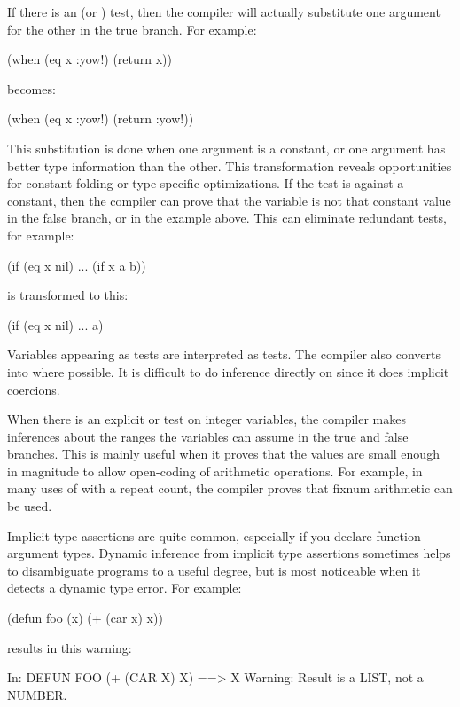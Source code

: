 If there is an  (or ) test, then the compiler will actually
substitute one argument for the other in the true branch.  For example:
\begin{lisp}
(when (eq x :yow!) (return x))
\end{lisp}
becomes:
\begin{lisp}
(when (eq x :yow!) (return :yow!))
\end{lisp}
This substitution is done when one argument is a constant, or one argument has
better type information than the other.  This transformation reveals
opportunities for constant folding or type-specific optimizations.  If the test
is against a constant, then the compiler can prove that the variable is not
that constant value in the false branch, or 
in the example above.  This can eliminate redundant tests, for example:
\begin{example}
(if (eq x nil)
    ...
    (if x a b))
\end{example}
is transformed to this:
\begin{example}
(if (eq x nil)
    ...
    a)
\end{example}
Variables appearing as  tests are interpreted as 
 tests.  The compiler also converts \code{=} into
 where possible.  It is difficult to do inference directly on \code{=}
since it does implicit coercions.

When there is an explicit \code{<} or \code{>} test on integer variables, the
compiler makes inferences about the ranges the variables can assume in the true
and false branches.  This is mainly useful when it proves that the values are
small enough in magnitude to allow open-coding of arithmetic operations.  For
example, in many uses of  with a  repeat count, the
compiler proves that fixnum arithmetic can be used.

Implicit type assertions are quite common, especially if you declare function
argument types.  Dynamic inference from implicit type assertions sometimes
helps to disambiguate programs to a useful degree, but is most noticeable when
it detects a dynamic type error.  For example:
\begin{lisp}
(defun foo (x)
  (+ (car x) x))
\end{lisp} 
results in this warning:
\begin{example}
In: DEFUN FOO
  (+ (CAR X) X)
==>
  X
Warning: Result is a LIST, not a NUMBER.
\end{example}

